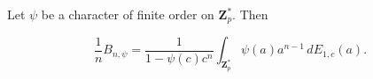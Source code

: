 Let $\psi$ be a character of finite order on $\mathbf{Z}_p^*$. Then

$$\frac{1}{n} B_{n,\psi} = \frac{1}{1 - \psi(c)c^n} \int_{\mathbf{Z}_p^*} \psi(a) a^{n-1} \, dE_{1,c}(a).$$
